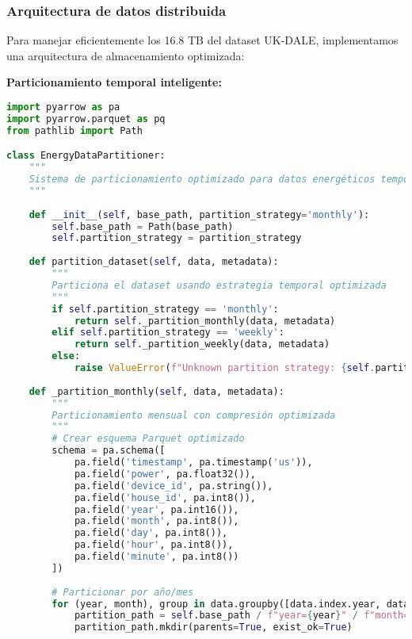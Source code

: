 \subsubsection{Arquitectura de datos distribuida}

Para manejar eficientemente los 16.8 TB del dataset UK-DALE, implementamos una arquitectura de almacenamiento optimizada:

\textbf{Particionamiento temporal inteligente:}

\begin{lstlisting}[language=Python, caption=Sistema de particionamiento temporal]
import pyarrow as pa
import pyarrow.parquet as pq
from pathlib import Path

class EnergyDataPartitioner:
    """
    Sistema de particionamiento optimizado para datos energéticos temporales
    """
    
    def __init__(self, base_path, partition_strategy='monthly'):
        self.base_path = Path(base_path)
        self.partition_strategy = partition_strategy
        
    def partition_dataset(self, data, metadata):
        """
        Particiona el dataset usando estrategia temporal optimizada
        """
        if self.partition_strategy == 'monthly':
            return self._partition_monthly(data, metadata)
        elif self.partition_strategy == 'weekly':
            return self._partition_weekly(data, metadata)
        else:
            raise ValueError(f"Unknown partition strategy: {self.partition_strategy}")
    
    def _partition_monthly(self, data, metadata):
        """
        Particionamiento mensual con compresión optimizada
        """
        # Crear esquema Parquet optimizado
        schema = pa.schema([
            pa.field('timestamp', pa.timestamp('us')),
            pa.field('power', pa.float32()),
            pa.field('device_id', pa.string()),
            pa.field('house_id', pa.int8()),
            pa.field('year', pa.int16()),
            pa.field('month', pa.int8()),
            pa.field('day', pa.int8()),
            pa.field('hour', pa.int8()),
            pa.field('minute', pa.int8())
        ])
        
        # Particionar por año/mes
        for (year, month), group in data.groupby([data.index.year, data.index.month]):
            partition_path = self.base_path / f"year={year}" / f"month={month:02d}"
            partition_path.mkdir(parents=True, exist_ok=True)
            

\end{lstlisting}
